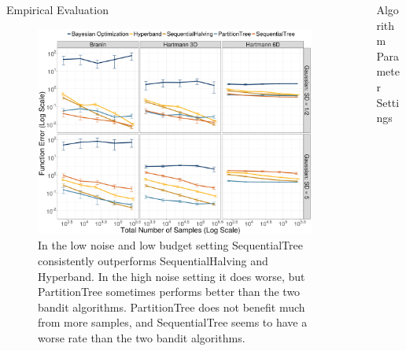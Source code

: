 \documentclass[final]{beamer}
\newlength{\sepwid}
\newlength{\onecolwid}
\newlength{\twocolwid}
\begin{document}
\begin{frame}[t]
\begin{columns}[t]
\begin{column}{\twocolwid}
\begin{block}{Empirical Evaluation}

\begin{figure}[H]
  \includegraphics[width=\textwidth]{emp_results.png}
    \caption{In the low noise and low budget setting SequentialTree consistently outperforms SequentialHalving and Hyperband. In the high noise setting it does worse, but PartitionTree sometimes performs better than the two bandit algorithms. PartitionTree does not benefit much from more samples, and SequentialTree seems to have a worse rate than the two bandit algorithms.}
\end{figure}

\end{block}


\end{column} %

\begin{column}{\sepwid}\end{column} %

\begin{column}{\onecolwid} %


\begin{block}{Algorithm Parameter Settings}
\begin{figure}[H]


\end{figure}
\end{block}
\end{column}
\end{columns}
\end{frame}
\end{document}
